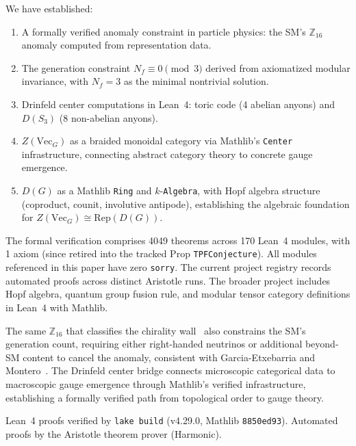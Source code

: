 \documentclass[aps,prl,twocolumn,superscriptaddress]{revtex4-2}
\begin{document}
We have established:
\begin{enumerate}
\item A formally verified anomaly constraint in particle physics: the
SM's $\mathbb{Z}_{16}$ anomaly computed from representation data.
\item The generation constraint $N_f \equiv 0 \pmod{3}$ derived from axiomatized
modular invariance, with $N_f = 3$ as the minimal nontrivial solution.
\item Drinfeld center computations in Lean~4: toric code (4 abelian
anyons) and $D(S_3)$ (8 non-abelian anyons).
\item $Z(\mathrm{Vec}_G)$ as a braided monoidal category via Mathlib's
\texttt{Center} infrastructure, connecting abstract category theory to
concrete gauge emergence.
\item $D(G)$ as a Mathlib \texttt{Ring} and $k$-\texttt{Algebra}, with Hopf
algebra structure (coproduct, counit, involutive antipode), establishing the
algebraic foundation for $Z(\mathrm{Vec}_G) \cong \mathrm{Rep}(D(G))$.
\end{enumerate}

The formal verification comprises 4049 theorems across 170 Lean~4
modules, with 1 axiom (since retired into the tracked Prop
\texttt{TPFConjecture}). All modules referenced
in this paper have zero \texttt{sorry}. The current project registry
records \aristotleproved{} automated proofs across \aristotleruns{} distinct
Aristotle runs.
The broader project includes Hopf algebra, quantum group fusion rule,
and modular tensor category definitions in Lean~4 with Mathlib.

The same $\mathbb{Z}_{16}$ that classifies the chirality wall~\cite{GioiaThorngrenPRL2026}
also constrains the SM's generation count, requiring either right-handed
neutrinos or additional beyond-SM content to cancel the anomaly, consistent
with Garcia-Etxebarria and Montero~\cite{GarciaEtxebarria2019}.
The Drinfeld center bridge connects microscopic categorical data to macroscopic
gauge emergence through Mathlib's verified infrastructure, establishing a
formally verified path from topological order to gauge theory.

\begin{acknowledgments}
Lean~4 proofs verified by \texttt{lake build} (v4.29.0, Mathlib \texttt{8850ed93}).
Automated proofs by the Aristotle theorem prover (Harmonic).
\end{acknowledgments}
\end{document}
